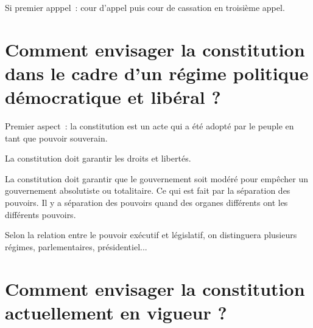 Si premier apppel~: cour d'appel puis cour de cassation en troisième appel.


\section{Comment envisager la constitution dans le cadre d'un régime politique démocratique et libéral ?}

Premier aspect~: la constitution est un acte qui a été adopté par le peuple en tant que pouvoir souverain.

La constitution doit garantir les droits et libertés.

La constitution doit garantir que le gouvernement soit modéré pour empêcher un gouvernement absolutiste ou totalitaire. Ce qui est fait par la séparation des pouvoirs. Il y a séparation des pouvoirs quand des organes différents ont les différents pouvoirs.

Selon la relation entre le pouvoir exécutif et législatif, on distinguera plusieurs régimes, parlementaires, présidentiel...


\section{Comment envisager la constitution actuellement en vigueur ?}
